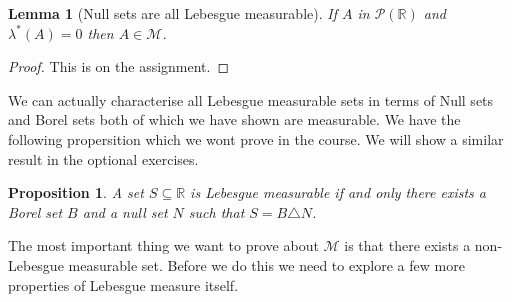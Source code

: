 \documentclass[11pt]{article}
\newtheorem{lem}[thm]{Lemma}
\newtheorem{prp}[thm]{Proposition}
\theoremstyle{definition}
\theoremstyle{remark}
\begin{document}
\begin{lem}[Null sets are all Lebesgue measurable]
If $A$ in $\mathscr{P}(\mathbb{R})$ and $\lambda^*(A) =0$ then $A \in \mathscr{M}$.
\end{lem}
\begin{proof}
This is on the assignment. 
\end{proof}

We can actually characterise all Lebesgue measurable sets in terms of Null sets and Borel sets both of which we have shown are measurable. We have the following propersition which we wont prove in the course. We will show a similar result in the optional exercises.
\begin{prp}
A set $S \subseteq \mathbb{R}$ is Lebesgue measurable if and only there exists a Borel set $B$ and a null set $N$ such that $S = B \triangle N$.
\end{prp}
The most important thing we want to prove about $\mathscr{M}$ is that there exists a non-Lebesgue measurable set. Before we do this we need to explore a few more properties of Lebesgue measure itself.
\end{document}
